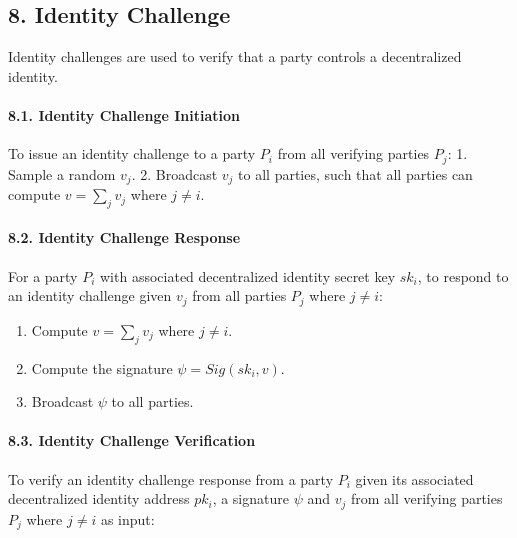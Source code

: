 \documentclass[
]{article}
\providecommand{\tightlist}{%
  \setlength{\itemsep}{0pt}\setlength{\parskip}{0pt}}
\begin{document}
\hypertarget{identity-challenges}{%
\subsection{8. Identity Challenge}\label{identity-challenges}}

Identity challenges are used to verify that a party controls a
decentralized identity.

\hypertarget{identity-challenge-initiation}{%
\paragraph{8.1. Identity Challenge
Initiation}\label{identity-challenge-initiation}}

To issue an identity challenge to a party \(P_i\) from all verifying
parties \(P_j\): 1. Sample a random \(v_j\). 2. Broadcast \(v_j\) to all
parties, such that all parties can compute \(v = \sum _j v_j\) where
\(j \neq i\).

\hypertarget{identity-challenge-response}{%
\paragraph{8.2. Identity Challenge
Response}\label{identity-challenge-response}}

For a party \(P_i\) with associated decentralized identity secret key
\(sk_i\), to respond to an identity challenge given \(v_j\) from all
parties \(P_j\) where \(j \neq i\):

\begin{enumerate}
\def\labelenumi{\arabic{enumi}.}
\tightlist
\item
  Compute \(v = \sum _j v_j\) where \(j \neq i\).
\item
  Compute the signature \(\psi = Sig(sk_i, v)\).
\item
  Broadcast \(\psi\) to all parties.
\end{enumerate}

\hypertarget{identity-challenge-verification}{%
\paragraph{8.3. Identity Challenge
Verification}\label{identity-challenge-verification}}

To verify an identity challenge response from a party \(P_i\) given its
associated decentralized identity address \(pk_i\), a signature \(\psi\)
and \(v_j\) from all verifying parties \(P_j\) where \(j \neq i\) as
input:
\end{document}
